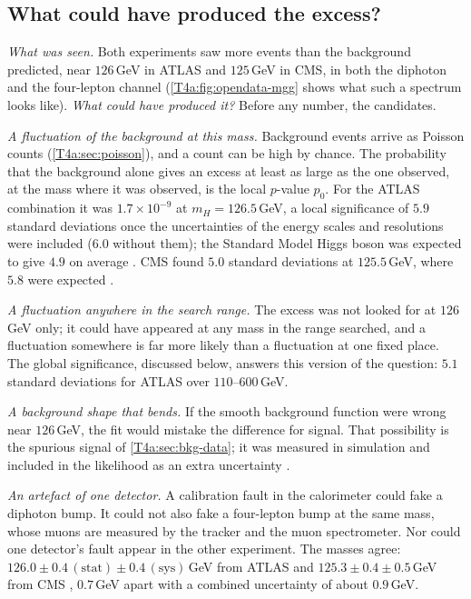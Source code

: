 \subsection{What could have produced the excess?}
\label{T4a:sec:higgs-excess}

\emph{What was seen.} Both experiments saw more events than the background predicted, near $126$\,GeV in ATLAS and $125$\,GeV in CMS, in both the diphoton and the four-lepton channel (\cref{T4a:fig:opendata-mgg} shows what such a spectrum looks like). \emph{What could have produced it?} Before any number, the candidates.

\emph{A fluctuation of the background at this mass.} Background events arrive as Poisson counts (\cref{T4a:sec:poisson}), and a count can be high by chance. The probability that the background alone gives an excess at least as large as the one observed, at the mass where it was observed, is the local $p$-value $p_0$. For the ATLAS combination it was $1.7\times10^{-9}$ at $m_H=126.5$\,GeV, a local significance of $5.9$ standard deviations once the uncertainties of the energy scales and resolutions were included ($6.0$ without them); the Standard Model Higgs boson was expected to give $4.9$ on average \cite[Sec.~9.2]{AadHiggs2012}. CMS found $5.0$ standard deviations at $125.5$\,GeV, where $5.8$ were expected \cite[Sec.~7.1]{ChatrchyanHiggs2012}.

\emph{A fluctuation anywhere in the search range.} The excess was not looked for at $126$\,GeV only; it could have appeared at any mass in the range searched, and a fluctuation somewhere is far more likely than a fluctuation at one fixed place. The global significance, discussed below, answers this version of the question: $5.1$ standard deviations for ATLAS over $110$--$600$\,GeV.

\emph{A background shape that bends.} If the smooth background function were wrong near $126$\,GeV, the fit would mistake the difference for signal. That possibility is the spurious signal of \cref{T4a:sec:bkg-data}; it was measured in simulation and included in the likelihood as an extra uncertainty \cite[Sec.~5.5]{AadHiggs2012}.

\emph{An artefact of one detector.} A calibration fault in the calorimeter could fake a diphoton bump. It could not also fake a four-lepton bump at the same mass, whose muons are measured by the tracker and the muon spectrometer. Nor could one detector's fault appear in the other experiment. The masses agree: $126.0\pm0.4\,(\text{stat})\pm0.4\,(\text{sys})$\,GeV from ATLAS \cite[Sec.~9.3]{AadHiggs2012} and $125.3\pm0.4\pm0.5$\,GeV from CMS \cite[Sec.~7]{ChatrchyanHiggs2012}, $0.7$\,GeV apart with a combined uncertainty of about $0.9$\,GeV.

